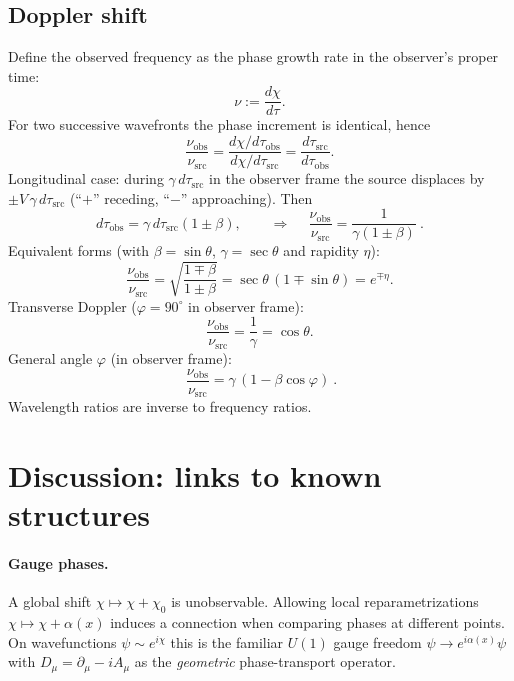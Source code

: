 \documentclass[11pt]{article}
\numberwithin{equation}{section}
\begin{document}
\subsection{Doppler shift}
Define the observed frequency as the phase growth rate in the observer's proper time:
\begin{equation}
\nu:=\frac{d\chi}{d\tau}.
\label{eq:381}
\end{equation}
For two successive wavefronts the phase increment is identical, hence
\begin{equation}
\frac{\nu_{\mathrm{obs}}}{\nu_{\mathrm{src}}}
=\frac{d\chi/d\tau_{\mathrm{obs}}}{d\chi/d\tau_{\mathrm{src}}}
=\frac{d\tau_{\mathrm{src}}}{d\tau_{\mathrm{obs}}}.
\label{eq:382}
\end{equation}
Longitudinal case: during $\gamma\,d\tau_{\mathrm{src}}$ in the observer frame the source displaces by $\pm V\,\gamma\,d\tau_{\mathrm{src}}$ (``$+$'' receding, ``$-$'' approaching). Then
\begin{equation}
d\tau_{\mathrm{obs}}=\gamma\,d\tau_{\mathrm{src}}(1\pm\beta),\qquad
\Rightarrow\quad
\boxed{\ \frac{\nu_{\mathrm{obs}}}{\nu_{\mathrm{src}}}=\frac{1}{\gamma(1\pm\beta)}\ }.
\label{eq:384}
\end{equation}
Equivalent forms (with $\beta=\sin\theta$, $\gamma=\sec\theta$ and rapidity $\eta$):
\begin{equation}
\frac{\nu_{\mathrm{obs}}}{\nu_{\mathrm{src}}}
=\sqrt{\frac{1\mp\beta}{1\pm\beta}}
=\sec\theta\,(1\mp\sin\theta)
=e^{\mp\eta}.
\label{eq:385}
\end{equation}
Transverse Doppler ($\varphi=90^\circ$ in observer frame):
\begin{equation}
\frac{\nu_{\mathrm{obs}}}{\nu_{\mathrm{src}}}=\frac{1}{\gamma}=\cos\theta.
\label{eq:389}
\end{equation}
General angle $\varphi$ (in observer frame):
\begin{equation}
\boxed{\ \frac{\nu_{\mathrm{obs}}}{\nu_{\mathrm{src}}}=\gamma\,(1-\beta\cos\varphi)\ }.
\label{eq:3810}
\end{equation}
Wavelength ratios are inverse to frequency ratios.

\section{Discussion: links to known structures}
\paragraph{Gauge phases.} A global shift $\chi\mapsto\chi+\chi_0$ is unobservable. Allowing local reparametrizations $\chi\mapsto\chi+\alpha(x)$ induces a connection when comparing phases at different points. On wavefunctions $\psi\sim e^{i\chi}$ this is the familiar $U(1)$ gauge freedom $\psi\to e^{i\alpha(x)}\psi$ with $D_\mu=\partial_\mu-iA_\mu$ as the \emph{geometric} phase-transport operator.
\end{document}
